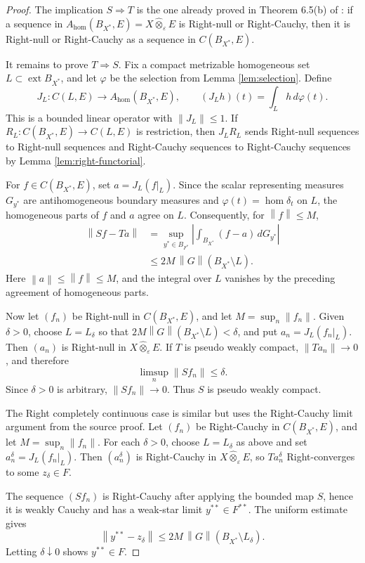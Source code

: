 \documentclass[11pt]{article}
\newcommand{\ot}{\widehat{\otimes}_{\varepsilon}}
\newcommand{\BX}{B_{X^*}}
\newcommand{\ext}{\operatorname{ext}}
\newcommand{\homop}{\operatorname{hom}}
\newcommand{\norm}[1]{\left\|#1\right\|}
\begin{document}
\begin{proof}
The implication \(S\Rightarrow T\) is the one already proved in Theorem 6.5(b) of \cite{ondrej-spurny}: if a sequence in \(A_{\homop}(\BX,E)=X\ot E\) is Right-null or Right-Cauchy, then it is Right-null or Right-Cauchy as a sequence in \(C(\BX,E)\).

It remains to prove \(T\Rightarrow S\).  Fix a compact metrizable homogeneous set \(L\subset \ext\BX\), and let \(\varphi\) be the selection from Lemma \ref{lem:selection}.  Define
\[
  J_L:C(L,E)\to A_{\homop}(\BX,E),\qquad
  (J_L h)(t)=\int_L h\,d\varphi(t).
\]
This is a bounded linear operator with \(\norm{J_L}\leq 1\).  If \(R_L:C(\BX,E)\to C(L,E)\) is restriction, then \(J_LR_L\) sends Right-null sequences to Right-null sequences and Right-Cauchy sequences to Right-Cauchy sequences by Lemma \ref{lem:right-functorial}.

For \(f\in C(\BX,E)\), set \(a=J_L(f|_L)\).  Since the scalar representing measures \(G_{y^*}\) are antihomogeneous boundary measures and \(\varphi(t)=\homop\delta_t\) on \(L\), the homogeneous parts of \(f\) and \(a\) agree on \(L\).  Consequently, for \(\norm{f}\leq M\),
\[
\begin{aligned}
  \norm{Sf-Ta}
  &= \sup_{y^*\in B_{F^*}}
     \left|\int_{\BX} (f-a)\,dG_{y^*}\right|  \\
  &\leq 2M\,\norm{G}(\BX\setminus L).
\end{aligned}
\]
Here \(\norm{a}\leq\norm{f}\leq M\), and the integral over \(L\) vanishes by the preceding agreement of homogeneous parts.

Now let \((f_n)\) be Right-null in \(C(\BX,E)\), and let \(M=\sup_n\norm{f_n}\).  Given \(\delta>0\), choose \(L=L_\delta\) so that \(2M\norm{G}(\BX\setminus L)<\delta\), and put \(a_n=J_L(f_n|_L)\).  Then \((a_n)\) is Right-null in \(X\ot E\).  If \(T\) is pseudo weakly compact, \(\norm{Ta_n}\to 0\), and therefore
\[
  \limsup_n \norm{Sf_n}\leq \delta .
\]
Since \(\delta>0\) is arbitrary, \(\norm{Sf_n}\to 0\).  Thus \(S\) is pseudo weakly compact.

The Right completely continuous case is similar but uses the Right-Cauchy limit argument from the source proof.  Let \((f_n)\) be Right-Cauchy in \(C(\BX,E)\), and let \(M=\sup_n\norm{f_n}\).  For each \(\delta>0\), choose \(L=L_\delta\) as above and set \(a_n^\delta=J_L(f_n|_L)\).  Then \((a_n^\delta)\) is Right-Cauchy in \(X\ot E\), so \(Ta_n^\delta\) Right-converges to some \(z_\delta\in F\).

The sequence \((Sf_n)\) is Right-Cauchy after applying the bounded map \(S\), hence it is weakly Cauchy and has a weak-star limit \(y^{**}\in F^{**}\).  The uniform estimate gives
\[
  \norm{y^{**}-z_\delta}\leq 2M\,\norm{G}(\BX\setminus L_\delta).
\]
Letting \(\delta\downarrow 0\) shows \(y^{**}\in F\).


\end{proof}
\end{document}
